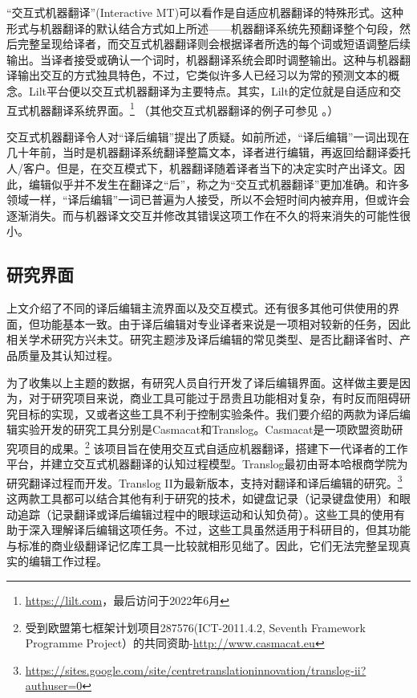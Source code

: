 \documentclass[output=paper,colorlinks,citecolor=brown]{langscibook}
\begin{document}
“交互式机器翻译”(Interactive MT)可以看作是自适应机器翻译的特殊形式。这种形式与机器翻译的默认结合方式如上所述——机器翻译系统先预翻译整个句段，然后完整呈现给译者，而交互式机器翻译则会根据译者所选的每个词或短语调整后续输出。当译者接受或确认一个词时，机器翻译系统会即时调整输出。这种与机器翻译输出交互的方式独具特色，不过，它类似许多人已经习以为常的预测文本的概念。Lilt平台便以交互式机器翻译为主要特点。其实，Lilt的定位就是自适应和交互式机器翻译系统界面。\footnote{\url{https://lilt.com}，最后访问于2022年6月} （其他交互式机器翻译的例子可参见 \citealt{TorregrosaRivero2018}。）

交互式机器翻译令人对“译后编辑”提出了质疑。如前所述，“译后编辑”一词出现在几十年前，当时是机器翻译系统翻译整篇文本，译者进行编辑，再返回给翻译委托人/客户。但是，在交互模式下，机器翻译随着译者当下的决定实时产出译文。因此，编辑似乎并不发生在翻译之“后”，称之为“交互式机器翻译”更加准确。和许多领域一样，“译后编辑”一词已普遍为人接受，所以不会短时间内被弃用，但或许会逐渐消失。而与机器译文交互并修改其错误这项工作在不久的将来消失的可能性很小。

\subsection{研究界面}

上文介绍了不同的译后编辑主流界面以及交互模式。还有很多其他可供使用的界面，但功能基本一致。由于译后编辑对专业译者来说是一项相对较新的任务，因此相关学术研究方兴未艾。研究主题涉及译后编辑的常见类型、是否比翻译省时、产品质量及其认知过程。

为了收集以上主题的数据，有研究人员自行开发了译后编辑界面。这样做主要是因为，对于研究项目来说，商业工具可能过于昂贵且功能相对复杂，有时反而阻碍研究目标的实现，又或者这些工具不利于控制实验条件。我们要介绍的两款为译后编辑实验开发的研究工具分别是Casmacat和Translog。Casmacat是一项欧盟资助研究项目的成果。\footnote{受到欧盟第七框架计划项目287576(ICT-2011.4.2, Seventh Framework Programme Project）的共同资助-\url{http://www.casmacat.eu}} 该项目旨在使用交互式自适应机器翻译，搭建下一代译者的工作平台，并建立交互式机器翻译的认知过程模型。Translog最初由哥本哈根商学院为研究翻译过程而开发。Translog II为最新版本，支持对翻译和译后编辑的研究。\footnote{\url{https://sites.google.com/site/centretranslationinnovation/translog-ii?authuser=0}} 这两款工具都可以结合其他有利于研究的技术，如键盘记录（记录键盘使用）和眼动追踪（记录翻译或译后编辑过程中的眼球运动和认知负荷）。这些工具的使用有助于深入理解译后编辑这项任务。不过，这些工具虽然适用于科研目的，但其功能与标准的商业级翻译记忆库工具一比较就相形见绌了。因此，它们无法完整呈现真实的编辑工作过程。
\end{document}
